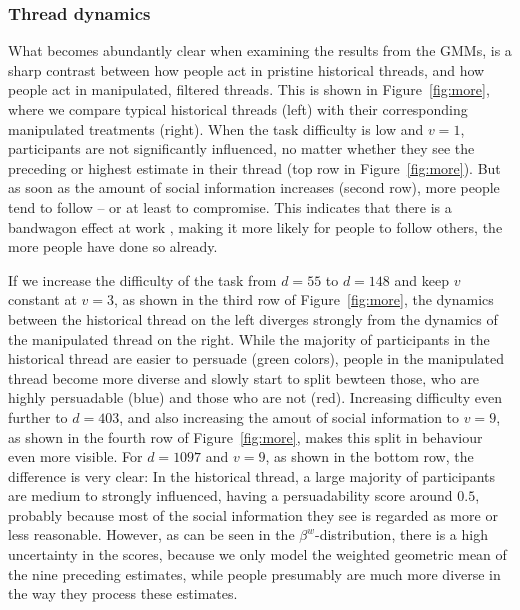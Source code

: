 \documentclass[9pt,a4paper,twocolumn,lineno]{article}
\begin{document}
\subsubsection*{Thread dynamics}
What becomes abundantly clear when examining the results from the GMMs, is a sharp contrast between how people act in pristine historical threads, and how people act in manipulated, filtered threads. This is shown in Figure~\ref{fig:more}, where we compare typical historical threads (left) with their corresponding manipulated treatments (right). When the task difficulty is low and $v=1$, participants are not significantly influenced, no matter whether they see the preceding or highest estimate in their thread (top row in Figure~\ref{fig:more}). But as soon as the amount of social information increases (second row), more people tend to follow – or at least to compromise. This indicates that there is a bandwagon effect at work \cite{bikhchandani1992theory, lee2018understanding}, making it more likely for people to follow others, the more people have done so already. 

If we increase the difficulty of the task from $d=55$ to $d=148$ and keep $v$ constant at $v=3$, as shown in the third row of Figure~\ref{fig:more}, the dynamics between the historical thread on the left diverges strongly from the dynamics of the manipulated thread on the right. While the majority of participants in the historical thread are easier to persuade (green colors), people in the manipulated thread become more diverse and slowly start to split bewteen those, who are highly persuadable (blue) and those who are not (red). Increasing difficulty even further to $d=403$, and also increasing the amout of social information to $v=9$, as shown in the fourth row of Figure~\ref{fig:more}, makes this split in behaviour even more visible. For $d=1097$ and $v=9$, as shown in the bottom row, the difference is very clear: In the historical thread, a large majority of participants are medium to strongly influenced, having a persuadability score around $0.5$, probably because most of the social information they see is regarded as more or less reasonable. However, as can be seen in the $\beta^w$-distribution, there is a high uncertainty in the scores, because we only model the weighted geometric mean of the nine preceding estimates, while people presumably are much more diverse in the way they process these estimates.


\end{document}
